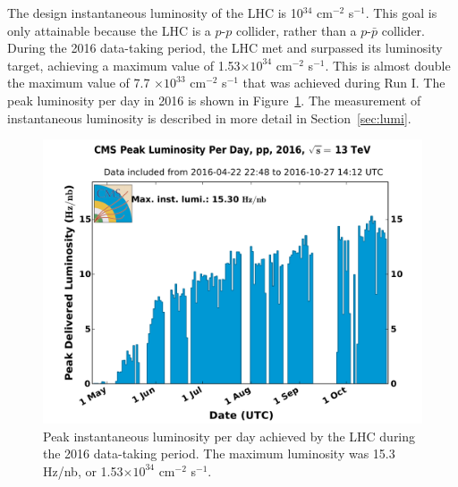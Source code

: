 The design instantaneous luminosity of the LHC is 10$^{34}$ cm$^{-2}$ s$^{-1}$. This goal is only attainable because the LHC is a $p$-$p$ collider, rather than a $p$-$\bar{p}$ collider. During the 2016 data-taking period, the LHC met and surpassed its luminosity target, achieving a maximum value of 1.53$\times 10^{34}$ cm$^{-2}$ s$^{-1}$. This is almost double the maximum value of 7.7 $\times 10^{33}$ cm$^{-2}$ s$^{-1}$ that was achieved during Run I. The peak luminosity per day in 2016 is shown in Figure~\ref{fig:instLumi}. The measurement of instantaneous luminosity is described in more detail in Section~\ref{sec:lumi}. 

\begin{figure}[h!]
	\centering
	\includegraphics[width=\linewidth]{Figures/LHC/peak_lumi_per_day_pp_2016.pdf}
       \caption[Peak instantaneous luminosity per day achieved by the LHC during the 2016 data-taking period.]
       {Peak instantaneous luminosity per day achieved by the LHC during the 2016 data-taking period. 
       The maximum luminosity was 15.3 Hz/nb, or 1.53$\times 10^{34}$ cm$^{-2}$ s$^{-1}$. }
       \label{fig:instLumi}
\end{figure}





